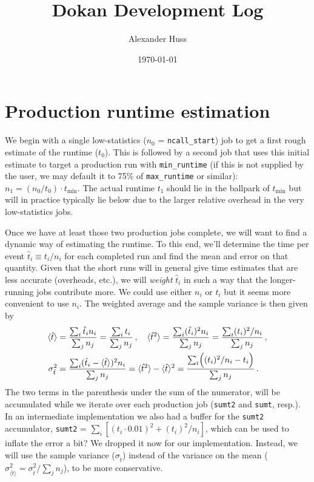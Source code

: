 \documentclass[11pt]{article}
\author{Alexander Huss}
\date{\today}
\title{Dokan Development Log}
\begin{document}
\maketitle
\tableofcontents

\section{Production runtime estimation}
\label{sec:orgf4ad4e4}
We begin with a single low-statistics (\(n_0\) = \texttt{ncall\_start}) job to get a first rough estimate of the runtime (\(t_0\)).
This is followed by a second job that uses this initial estimate to target a production run with \texttt{min\_runtime} (if this is not supplied by the user, we may default it to 75\% of \texttt{max\_runtime} or similar): \(n_1 = (n_0/t_0) \cdot t_\mathrm{min}\).
The actual runtime \(t_1\) should lie in the ballpark of \(t_\mathrm{min}\) but will in practice typically lie below due to the larger relative overhead in the very low-statistics jobs.

Once we have at least those two production jobs complete, we will want to find a dynamic way of estimating the runtime.
To this end, we'll determine the time per event \(\hat{t}_i \equiv t_i/n_i\) for each completed run and find the mean and error on that quantity.
Given that the short runs will in general give time estimates that are less accurate (overheads, etc.), we will \emph{weight} \(\hat{t}_i\) in such a way that the longer-running jobs contribute more. We could use either \(n_i\) or \(t_i\) but it seems more convenient to use \(n_i\).
The weighted average and the sample variance is then given by
\begin{align}
  \langle \hat{t} \rangle
  &= \frac{\sum_i \hat{t}_i n_i}{\sum_j n_j}
  =  \frac{\sum_i t_i}{\sum_j n_j}
  \, , \quad
  \langle \hat{t}^2 \rangle
  = \frac{\sum_i (\hat{t}_i)^2 n_i}{\sum_j n_j}
  =  \frac{\sum_i (t_i)^2 / n_i}{\sum_j n_j}
  \, , \\
  \sigma^2_{\hat{t}}
  &= \frac{\sum_i (\hat{t}_i - \langle \hat{t} \rangle)^2  n_i}{\sum_j n_j}
  = \langle \hat{t}^2 \rangle - \langle \hat{t} \rangle^2
  = \frac{\sum_i \Bigl( (t_i)^2 / n_i - t_i \Bigr)}{\sum_j n_j}
  \, .
\end{align}
The two terms in the parenthesis under the sum of the numerator, will be accumulated while we iterate over each production job (\texttt{sumt2} and \texttt{sumt}, resp.).
In an intermediate implementation we also had a buffer for the \texttt{sumt2} accumulator, \texttt{sumt2} = \(\sum_i [ (t_i \cdot 0.01)^2 + (t_i)^2 / n_i ]\), which can be used to inflate the error a bit?
We dropped it now for our implementation.
Instead, we will use the sample variance (\(\sigma_{\hat{t}}\)) instead of the variance on the mean (\(\sigma^2_{\langle\hat{t}\rangle} = \sigma^2_{\hat{t}} / \sum_j n_j\)), to be more conservative.
\end{document}
